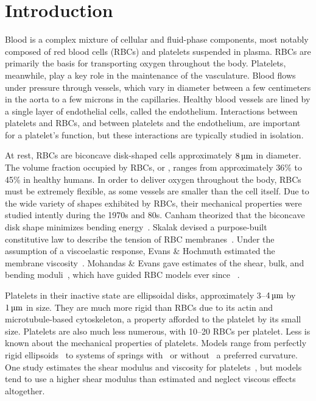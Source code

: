 \section{Introduction}

Blood is a complex mixture of cellular and fluid-phase components, most notably composed of red
blood cells (RBCs) and platelets suspended in plasma. RBCs are primarily the basis for
transporting oxygen throughout the body. Platelets, meanwhile, play a key role in the
maintenance of the vasculature. Blood flows under pressure through vessels, which vary in
diameter between a few centimeters in the aorta to a few microns in the capillaries.
Healthy blood vessels are lined by a single layer of endothelial cells, called the
endothelium.  Interactions between platelets and RBCs, and between platelets and the
endothelium, are important for a platelet's function, but these interactions are
typically studied in isolation.

At rest, RBCs are biconcave disk-shaped cells approximately $8\um$ in diameter. The
volume fraction occupied by RBCs, or , ranges from approximately 36\% to
45\% in healthy humans. In order to deliver oxygen throughout the body, RBCs must be
extremely flexible, as some vessels are smaller than the cell itself. Due to the wide
variety of shapes exhibited by RBCs, their mechanical properties were studied intently
during the 1970s and 80s. Canham theorized that the biconcave disk shape minimizes
bending energy~\cite{Canham:1970wx}. Skalak  devised a purpose-built
constitutive law to describe the tension of RBC membranes~\cite{Skalak:1973tp}. Under the
assumption of a viscoelastic response, Evans \& Hochmuth estimated the membrane
viscosity~\cite{Evans:1976tx}. Mohandas \& Evans gave estimates of the shear, bulk, and
bending moduli~\cite{Mohandas:1994tg}, which have guided RBC models ever since~%
\cite{Pozrikidis:2003ft,Fai:2013do}.

Platelets in their inactive state are ellipsoidal disks, approximately 3--$4\um$ by
$1\um$ in size. They are much more rigid than RBCs due to its actin and microtubule-based
cytoskeleton, a property afforded to the platelet by its small size. Platelets are also
much less numerous, with 10--20 RBCs per platelet. Less is known about the mechanical
properties of platelets. Models range from perfectly rigid ellipsoids~\cite{Wang:2013gs}
to systems of springs with~\cite{Erickson:2010ep,Skorczewski:2013jn} or without~%
\cite{Wu:2014gt} a preferred curvature. One study estimates the shear modulus and
viscosity for platelets~\cite{Haga:1998wa}, but models tend to use a higher shear modulus
than estimated and neglect viscous effects altogether.

